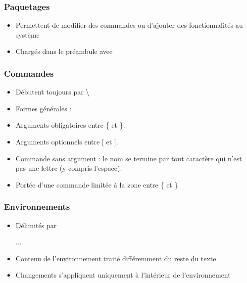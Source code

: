 \begin{frame}[c,fragile]

	\frametitle{Paquetages}
	
	\begin{itemize}
		\item Permettent de modifier des commandes ou d’ajouter des	fonctionnalités au système
		\item Chargés dans le préambule avec
		
	\begin{codesource}
	\usepackage{paquetage}
	\usepackage[options]{paquetage}
	\usepackage{paquetage1,paquetage2,...}
	\end{codesource}
	\end{itemize}
\end{frame}


\begin{frame}[fragile]

	\frametitle{Commandes}
	
	\begin{itemize}
		\item Débutent toujours par \textbackslash
		\item Formes générales : 
			
	\begin{codesource}
	\end{codesource}
					
		\item Arguments obligatoires entre \{  et \}.
		\item Arguments optionnels entre [ et ].
		\item Commande sans argument : le nom se termine par tout caractère	qui n’est pas une lettre (y compris l’espace).
		\item Portée d’une commande limitée à la zone entre \{  et \}.
	\end{itemize}

\end{frame}


\begin{frame}[fragile]

	\frametitle{Environnements}
	
	\begin{itemize}
		\item Délimités par
		
	\begin{codesource}
	\begin{environnement}
		...
	\end{environnement}
	\end{codesource}
	
		\item Contenu de l’environnement traité différemment du reste du texte
		\item Changements s’appliquent uniquement à l’intérieur de l’environnement
	\end{itemize}

\end{frame}

